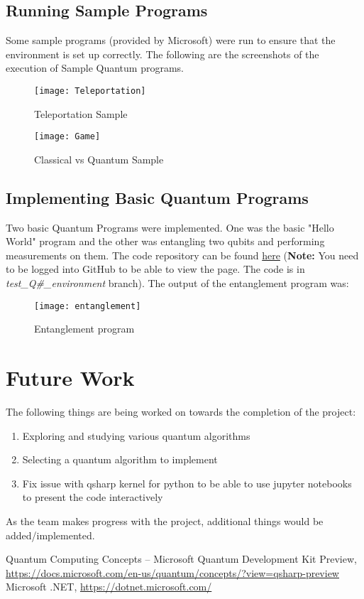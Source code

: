 \documentclass[]{article}
\begin{document}
		\subsection{Running Sample Programs}
			Some sample programs (provided by Microsoft)  were run to ensure that the environment is set up correctly. The following are the screenshots of the execution of Sample Quantum programs.
			\begin{figure}[H]
				\begin{center}
					\texttt{[image: Teleportation]}
				\end{center}
				\caption{Teleportation Sample}
			\end{figure}
				\begin{figure}[H]
				\begin{center}
					\texttt{[image: Game]}
				\end{center}
				\caption{Classical vs Quantum Sample}
			\end{figure}
		
		\subsection{Implementing Basic Quantum Programs}
			Two basic Quantum Programs were implemented. One was the basic "Hello World" program and the other was entangling two qubits and performing measurements on them. The code repository can be found  \href{https://github.com/ankit-pant/ipsc_quantum_algorithm_qsharp} {here} (\textbf{Note:} You need to be logged into GitHub to be able to view the page. The code is in \emph{test\_Q\#\_environment} branch). The output of the entanglement program was:
				\begin{figure}[H]
				\begin{center}
					\texttt{[image: entanglement]}
				\end{center}
				\caption{Entanglement program}
			\end{figure}
	
	\section{Future Work}
		The following things are being worked on towards the completion of the project:
		\begin{enumerate}
			\item Exploring and studying various quantum algorithms
			\item Selecting a quantum algorithm to implement
			\item Fix issue with qsharp kernel for python to be able to use jupyter notebooks to present the code interactively
		\end{enumerate}
		As the team makes progress with the project, additional things would be added/implemented.
			
	
	\begin{thebibliography}{5}
		 Quantum Computing Concepts -- Microsoft Quantum Development Kit Preview, \url{https://docs.microsoft.com/en-us/quantum/concepts/?view=qsharp-preview}
		 Microsoft .NET, \url{https://dotnet.microsoft.com/}
	\end{thebibliography}
			
	
\end{document}
